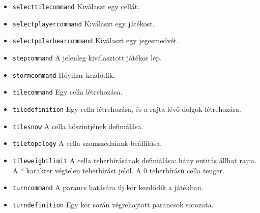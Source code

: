 \begin{itemize}
\item \texttt{select\textunderscore{}tile\textunderscore{}command}
Kiválaszt egy cellát.
\item \texttt{select\textunderscore{}player\textunderscore{}command}
Kiválaszt egy játékost.
\item \texttt{select\textunderscore{}polarbear\textunderscore{}command}
Kiválaszt egy jegesmedvét.
\item \texttt{step\textunderscore{}command}
A jelenleg kiválasztott játékos lép.
\item \texttt{storm\textunderscore{}command}
Hóvihar kezdődik.
\item \texttt{tile\textunderscore{}command}
Egy cella létrehozása.
\item \texttt{tile\textunderscore{}definition}
Egy cella létrehozása, és a rajta lévő dolgok létrehozása.
\item \texttt{tile\textunderscore{}snow}
A cella hószintjének definiálása.
\item \texttt{tile\textunderscore{}topology}
A cella szomszédainak beállítása.
\item \texttt{tile\textunderscore{}weight\textunderscore{}limit}
A cella teherbírásának definiálása: hány entitás állhat rajta. \newline A * karakter végtelen teherbírást jelöl. A 0 teherbírású cella tenger.
\item \texttt{turn\textunderscore{}command}
A parancs hatására új kör kezdődik a játékban.
\item \texttt{turn\textunderscore{}definition}
Egy kör során végrehajtott parancsok sorozata.
\end{itemize}


